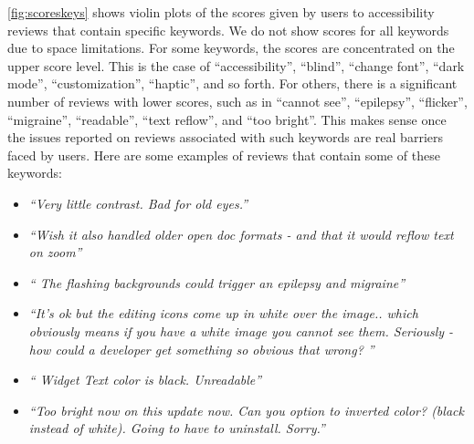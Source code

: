 \autoref{fig:scoreskeys} shows violin plots of the scores given by users to accessibility reviews that contain specific keywords. We do not show scores for all keywords due to space limitations. 
For some keywords, the scores are concentrated on the upper score level. This is the case of ``accessibility'', ``blind'', ``change font'', ``dark mode'', ``customization'', ``haptic'', and so forth. 
For others, there is a significant number of reviews with lower scores, such as in ``cannot see'', ``epilepsy'', ``flicker'', ``migraine'', ``readable'', ``text reflow'', and ``too bright''. This makes sense once the issues reported on reviews associated with such keywords are real barriers faced by users. Here are some examples of reviews that contain some of these keywords:
\begin{itemize}
 \item \textit{``Very little contrast. Bad for old eyes.''}
 \item \textit{``Wish it also handled older open doc formats - and that it would reflow text on zoom''}
 \item \textit{`` The flashing backgrounds could trigger an epilepsy and migraine''}
 \item \textit{``It's ok but the editing icons come up in white over the image.. which obviously means if you have a white image you cannot see them. Seriously - how could a developer get something so obvious that wrong? ''}
 \item \textit{`` Widget Text color is black. Unreadable''}
 \item \textit{``Too bright now on this update now. Can you option to inverted color? (black instead of white). Going to have to uninstall. Sorry.''}  
\end{itemize}



